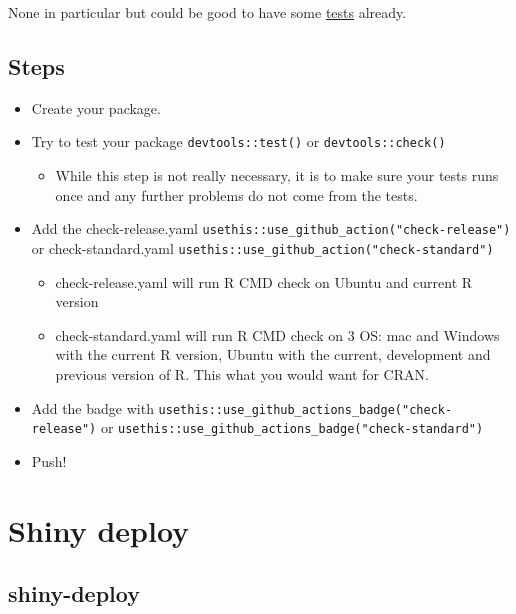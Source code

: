 \documentclass[
]{book}
\providecommand{\tightlist}{%
  \setlength{\itemsep}{0pt}\setlength{\parskip}{0pt}}
\begin{document}
None in particular but could be good to have some \href{https://r-pkgs.org/testing-basics.html}{tests} already.

\hypertarget{steps}{%
\section{Steps}\label{steps}}

\begin{itemize}
\item
  Create your package.
\item
  Try to test your package \texttt{devtools::test()} or \texttt{devtools::check()}

  \begin{itemize}
  \tightlist
  \item
    While this step is not really necessary, it is to make sure your tests runs once and any further problems do not come from the tests.
  \end{itemize}
\item
  Add the check-release.yaml \texttt{usethis::use\_github\_action("check-release")} or check-standard.yaml \texttt{usethis::use\_github\_action("check-standard")}

  \begin{itemize}
  \tightlist
  \item
    check-release.yaml will run R CMD check on Ubuntu and current R version
  \item
    check-standard.yaml will run R CMD check on 3 OS: mac and Windows with the current R version, Ubuntu with the current, development and previous version of R. This what you would want for CRAN.
  \end{itemize}
\item
  Add the badge with \texttt{usethis::use\_github\_actions\_badge("check-release")} or \texttt{usethis::use\_github\_actions\_badge("check-standard")}
\item
  Push!
\end{itemize}

\hypertarget{shiny-deploy}{%
\chapter{Shiny deploy}\label{shiny-deploy}}

\hypertarget{shiny-deploy-1}{%
\section{shiny-deploy}\label{shiny-deploy-1}}
\end{document}
